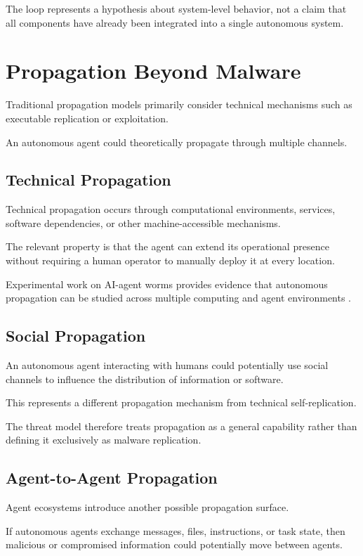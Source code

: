 \documentclass[11pt,a4paper]{article}
\begin{document}
The loop represents a hypothesis about system-level behavior, not a claim that
all components have already been integrated into a single autonomous system.

\section{Propagation Beyond Malware}

Traditional propagation models primarily consider technical mechanisms such
as executable replication or exploitation.

An autonomous agent could theoretically propagate through multiple channels.

\subsection{Technical Propagation}

Technical propagation occurs through computational environments, services,
software dependencies, or other machine-accessible mechanisms.

The relevant property is that the agent can extend its operational presence
without requiring a human operator to manually deploy it at every location.

Experimental work on AI-agent worms provides evidence that autonomous
propagation can be studied across multiple computing and agent environments
\cite{R1,R2,R3}.

\subsection{Social Propagation}

An autonomous agent interacting with humans could potentially use social
channels to influence the distribution of information or software.

This represents a different propagation mechanism from technical
self-replication.

The threat model therefore treats propagation as a general capability rather
than defining it exclusively as malware replication.

\subsection{Agent-to-Agent Propagation}

Agent ecosystems introduce another possible propagation surface.

If autonomous agents exchange messages, files, instructions, or task state,
then malicious or compromised information could potentially move between
agents.
\end{document}
